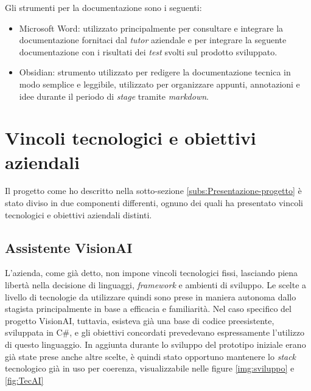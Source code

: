  Gli strumenti per la documentazione sono i seguenti: 
 \begin{itemize}
     \item Microsoft Word: utilizzato principalmente per consultare e integrare la documentazione fornitaci dal \textit{tutor} aziendale e per integrare la seguente documentazione con i risultati dei \textit{test} svolti sul prodotto sviluppato.
     \item Obsidian: strumento utilizzato per redigere la documentazione tecnica in modo semplice e leggibile, utilizzato per organizzare appunti, annotazioni e idee durante il periodo di \textit{stage} tramite \textit{markdown}.
 \end{itemize}

 
\section{Vincoli tecnologici e obiettivi aziendali}
Il progetto come ho descritto nella sotto-sezione \ref{subs:Presentazione-progetto} è stato diviso in due componenti differenti, ognuno dei quali ha presentato vincoli tecnologici e obiettivi aziendali distinti.

\subsection{Assistente VisionAI}
L'azienda, come già detto, non impone vincoli tecnologici fissi, lasciando piena libertà nella decisione di linguaggi, \textit{framework} e ambienti di sviluppo.
Le scelte a livello di tecnologie da utilizzare quindi sono prese in maniera autonoma dallo stagista principalmente in base a efficacia e familiarità.
Nel caso specifico del progetto VisionAI, tuttavia, esisteva già una base di codice preesistente, sviluppata in C\#, e gli obiettivi concordati prevedevano espressamente l'utilizzo di questo linguaggio. In aggiunta durante lo sviluppo del prototipo iniziale erano già state prese anche altre scelte, è quindi stato opportuno mantenere lo \textit{stack} tecnologico già in uso per coerenza, visualizzabile nelle figure \ref{img:sviluppo} e \ref{fig:TecAI}

